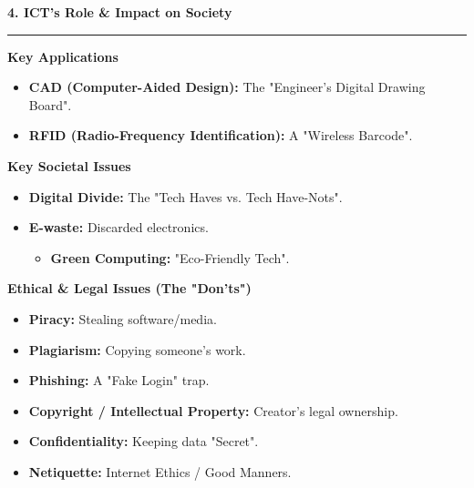 \documentclass[a4paper, 8pt]{extarticle}
\newcommand{\sectionheading}[1]{\large\textbf{#1}\par\noindent\rule{\linewidth}{0.4pt}}
\newcommand{\subsectionheading}[1]{\normalsize\textbf{#1}}
\begin{document}
\begin{multicols}{2}
\vspace{1em}
\sectionheading{4. ICT's Role \& Impact on Society}
\vspace{0.5em}
\subsectionheading{Key Applications}
\begin{itemize}
    \item \textbf{CAD (Computer-Aided Design):} The "Engineer's Digital Drawing Board".
    \item \textbf{RFID (Radio-Frequency Identification):} A "Wireless Barcode".
\end{itemize}
\subsectionheading{Key Societal Issues}
\begin{itemize}
    \item \textbf{Digital Divide:} The "Tech Haves vs. Tech Have-Nots".
    \item \textbf{E-waste:} Discarded electronics.
        \begin{itemize}
            \item \textbf{Green Computing:} "Eco-Friendly Tech".
        \end{itemize}
\end{itemize}
\subsectionheading{Ethical \& Legal Issues (The "Don'ts")}
\begin{itemize}
    \item \textbf{Piracy:} Stealing software/media.
    \item \textbf{Plagiarism:} Copying someone's work.
    \item \textbf{Phishing:} A "Fake Login" trap.
    \item \textbf{Copyright / Intellectual Property:} Creator's legal ownership.
    \item \textbf{Confidentiality:} Keeping data "Secret".
    \item \textbf{Netiquette:} Internet Ethics / Good Manners.
\end{itemize}

\end{multicols}
\end{document}
